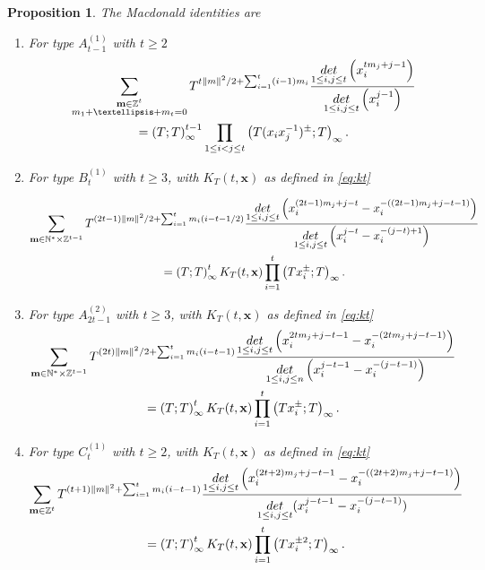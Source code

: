 \documentclass[11pt,letterpaper]{amsart}
\def\bbbz{\mathbb Z}
\def\det{{\rm det}}
\newtheorem{prop}[df]{Proposition}		%
\numberwithin{equation}{section}
\numberwithin{df}{section}
\begin{document}
\begin{prop}\label{prop:intermed_rewrite}
The Macdonald identities are
\begin{enumerate}
\item For type $A^{(1)}_{t-1}$ with $t\geq 2$
\begin{multline}\label{eq:macdoAfin}
\sum_{\substack{\mathbf{m}\in\bbbz^t\\m_1+\dots+m_t=0}}T^{t\lVert m\rVert^2/2+\sum_{i=1}^t(i-1)m_i}\frac{\underset{1\le i,j\le t}{\det}\left(x_i^{tm_j+j-1}\right)}{\underset{1\le i,j\le t}{\det}\left(x_i^{j-1}\right)} \\
=\left(T;T\right)_\infty^{t-1} \prod_{1\le i<j\le t}\left(T(x_ix_j^{-1})^{\pm};T\right)_\infty.
\end{multline}
\item For type $B^{(1)}_{t}$ with $t\geq 3$, with $K_T(t,\mathbf{x})$ as defined in \eqref{eq:kt}

\begin{multline}
\sum_{\mathbf{m}\in\mathbb{N}^*\times\bbbz^{t-1}}T^{(2t-1)\lVert m\rVert^2/2+\sum_{i=1}^tm_i(i-t-1/2)}\frac{\underset{1\le i,j\le t}{\det}\left(x_i^{(2t-1)m_j+j-t}-x_i^{-((2t-1)m_j+j-t-1)}\right)}{\underset{1\le i,j\le t}{\det}\left(x_i^{j-t}-x_i^{-(j-t)+1}\right)}\\
=\left(T;T\right)_\infty^{t} K_T(t,\mathbf{x})\prod_{i=1}^t \left(Tx_i^{\pm};T\right)_\infty .\label{eq:misignbterm}
\end{multline}

\item For type $A^{(2)}_{2t-1}$ with $t\geq 3$, with $K_T(t,\mathbf{x})$ as defined in \eqref{eq:kt}
\begin{multline}
\sum_{\mathbf{m}\in\mathbb{N}^*\times\bbbz^{t-1}}T^{(2t)\lVert m\rVert^2/2+\sum_{i=1}^tm_i(i-t-1)}\frac{\underset{1\le i,j\le t}{\det}\left(x_i^{2tm_j+j-t-1}-x_i^{-(2tm_j+j-t-1)}\right)}{\underset{1\le i,j\le n}{\det}\left(x_i^{j-t-1}-x_i^{-(j-t-1)}\right)}\\
=\left(T;T\right)_\infty^{t} K_T(t,\mathbf{x})\prod_{i=1}^t \left(Tx_i^{\pm};T\right)_\infty .\label{eq:misignbvterm}
\end{multline}

\item For type $C^{(1)}_{t}$ with $t\geq 2$,  with $K_T(t,\mathbf{x})$ as defined in \eqref{eq:kt}
\begin{multline}
\sum_{\mathbf{m}\in\bbbz^t}T^{(t+1)\lVert m\rVert^2+\sum_{i=1}^tm_i(i-t-1)}\frac{\underset{1\le i,j\le t}{\det}\left(x_i^{(2t+2)m_j+j-t-1}-x_i^{-((2t+2)m_j+j-t-1)}\right)}{\underset{1\le i,j\le t}{\det}(x_i^{j-t-1}-x_i^{-(j-t-1)})}\\
=\left(T;T\right)_\infty^t K_T(t,{\bf x})\prod_{i=1}^t \left(Tx_i^{\pm2};T\right)_\infty .\label{eq:misign}
\end{multline}


\end{enumerate}
\end{prop}
\end{document}
